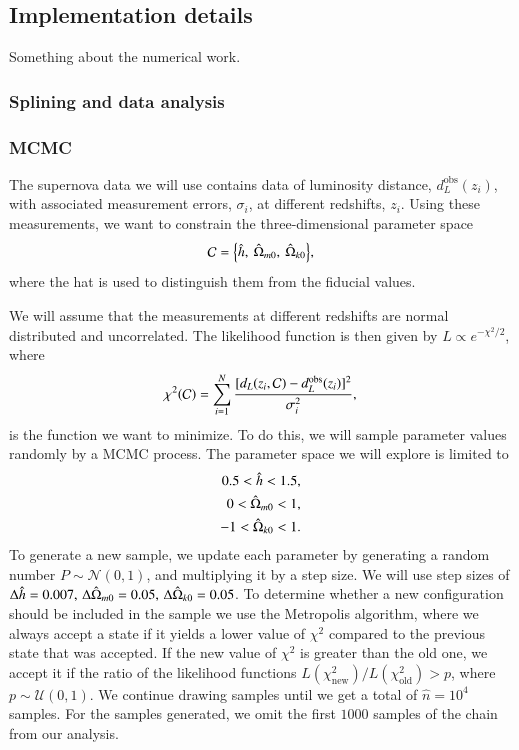 
\subsection{Implementation details}\label{M1:implementation} 
Something about the numerical work.
\subsubsection{Splining and data analysis }


\subsubsection{MCMC }
The supernova data we will use contains data of luminosity distance, $d_L^\mathrm{obs}(z_i)$, with associated measurement errors, $\sigma_i$, at different redshifts, $z_i$. Using these measurements, we want to constrain the three-dimensional parameter space 
\begin{equation}
    \mathcal{C} = \Big\{ \hat{h},\: \hat{\Omega}_{m0},\: \hat{\Omega}_{k0} \Big\}, \label{eq:M1:implementations:supernova_parameter_space}
\end{equation}  
where the hat is used to distinguish them from the fiducial values.   

We will assume that the measurements at different redshifts are normal distributed and uncorrelated. The likelihood function is then given by $L\propto e^{-\chi^2/2}$, where 
\begin{equation}
    \chi^2(\mathcal{C}) = \sum_{i=1}^N \frac{[d_L(z_i, \mathcal{C}) - d_L^\mathrm{obs}(z_i)]^2}{\sigma_i^2}, \label{eq:M1:implementations:chi2_supernova_data}
\end{equation}
is the function we want to minimize.  To do this, we will sample parameter values randomly by a MCMC process. The parameter space we will explore is limited to  
\begin{equation} \label{eq:M1:implementations:supernova_parameter_ranges}
    \begin{split}
        0.5 < \hat{h} < 1.5, \\
        0 < \hat{\Omega}_{m0} < 1, \\
        -1 < \hat{\Omega}_{k0} < 1.
    \end{split}
\end{equation}   
To generate a new sample, we update each parameter by generating a random number $P\sim\mathcal{N}(0,1)$, and multiplying it by a step size. We will use step sizes of $\Delta \hat{h} = 0.007,\,\Delta \hat{\Omega}_{m0}=0.05,\,\Delta\hat{\Omega}_{k0}=0.05$. To determine whether a new configuration should be included in the sample we use the Metropolis algorithm, where we always accept a state if it yields a lower value of $\chi^2$ compared to the previous state that was accepted. If the new value of $\chi^2$ is greater than the old one, we accept it if the ratio of the likelihood functions $L(\chi^2_\mathrm{new})/L(\chi^2_\mathrm{old})>p$, where $p\sim\mathcal{U}(0,1)$. We continue drawing samples until we get a total of $\hat{n}=10^4$ samples. For the samples generated, we omit the first $1000$ samples of the chain from our analysis.   

